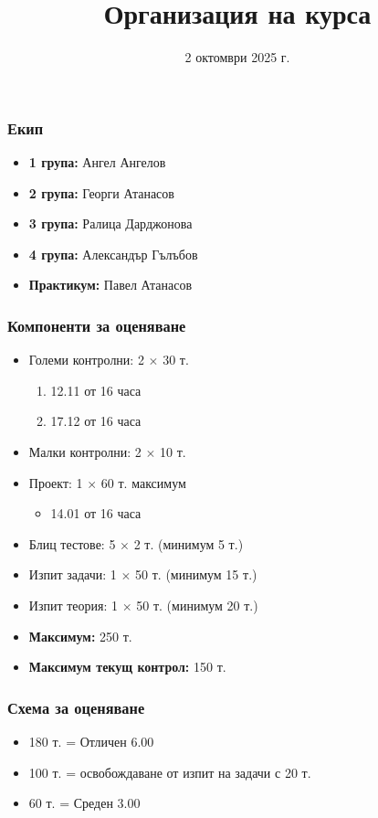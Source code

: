 \documentclass[alsotrans,beameroptions={aspectratio=169}]{beamerswitch}
\title{Организация на курса}
\date{2 октомври 2025 г.}
\begin{document}
\begin{frame}
  \titlepage
\end{frame}

\begin{frame}
  \frametitle{Екип}

  \begin{itemize}
  \item \textbf{1 група:} Ангел Ангелов
  \item \textbf{2 група:} Георги Атанасов
  \item \textbf{3 група:} Ралица Дарджонова
  \item \textbf{4 група:} Александър Гълъбов
  \item \textbf{Практикум:} Павел Атанасов
  \end{itemize}
\end{frame}

\begin{frame}
  \frametitle{Компоненти за оценяване}

  \begin{itemize}
  \item Големи контролни: 2 $\times$ 30 т.
    \begin{enumerate}
    \item 12.11 от 16 часа
    \item 17.12 от 16 часа
    \end{enumerate}
  \item Малки контролни: 2 $\times$ 10 т.
  \item Проект: 1 $\times$ 60 т. максимум
    \begin{itemize}
    \item 14.01 от 16 часа
    \end{itemize}
  \item Блиц тестове: 5 $\times$ 2 т. \alert{(минимум 5 т.)}
  \item Изпит задачи: 1 $\times$ 50 т. \alert{(минимум 15 т.)}
  \item Изпит теория: 1 $\times$ 50 т. \alert{(минимум 20 т.)}
  \item \textbf{Максимум:} 250 т.
  \item \textbf{Максимум текущ контрол:} 150 т.
  \end{itemize}
\end{frame}

\begin{frame}
  \frametitle{Схема за оценяване}

  \begin{itemize}
  \item 180 т. = Отличен 6.00
  \item 100 т. = освобождаване от изпит на задачи с 20 т.
  \item 60 т. = Среден 3.00
  \end{itemize}
\end{frame}
\end{document}
